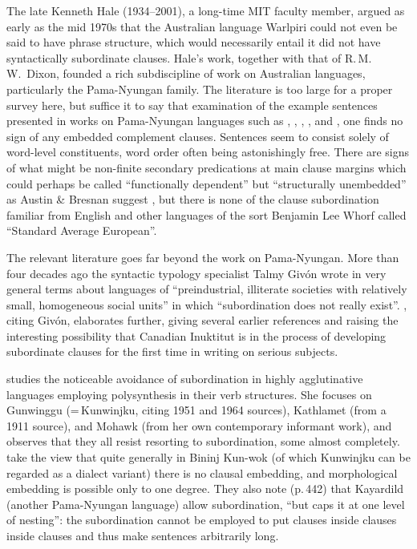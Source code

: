 \documentclass[output=paper,colorlinks,citecolor=brown
]{langscibook}
\begin{document}
The late Kenneth Hale (1934--2001), a long-time MIT faculty member,
argued as early as the mid 1970s that the Australian language Warlpiri
could not even be said to have phrase structure, which would necessarily
entail it did not have syntactically subordinate clauses. Hale's work,
together with that of R.\,M.\,W.\ Dixon, founded a rich subdiscipline
of work on Australian languages, particularly the Pama-Nyungan family.
The literature is too large for a proper survey here, but suffice it to
say that examination of the example sentences presented in works on
Pama-Nyungan languages such as \citet{Hale76}, \citet{Nash80},
\citet{Dixon81}, \citet{AustBres96}, and \citet{Pensalfini04},
one finds no sign of any embedded complement clauses. Sentences
seem to consist solely of word-level constituents, word order often
being astonishingly free. There are signs of what might be non-finite
secondary predications at main clause margins which could perhaps be
called ``functionally dependent'' but ``structurally unembedded'' as
Austin \& Bresnan suggest \citeyearpar[228, esp.\ n.\,13]{AustBres96},
but there is none of the clause subordination familiar from English
and other languages of the sort Benjamin Lee Whorf called
``Standard Average European''.

The relevant literature goes far beyond the work on Pama-Nyungan.
More than four decades ago the syntactic typology
specialist Talmy Giv{\'o}n \citeyearpar[298]{Givon79} wrote in very
general terms about languages of ``preindustrial, illiterate societies
with relatively small, homogeneous social units'' in which
``subordination does not really exist''. \citet[esp.\ pp.\,157--159]{Kalmar85}, citing Giv{\'o}n,
elaborates further, giving several earlier references and raising the
interesting possibility that Canadian Inuktitut is in the process of
developing subordinate clauses for the first time in writing on serious
subjects.

\citet{Mithun84} studies the noticeable avoidance of subordination
in highly agglutinative languages employing polysynthesis in their
verb structures. She focuses on Gunwinggu (=\,Kunwinjku, citing 1951
and 1964 sources), Kathlamet (from a 1911 source), and Mohawk (from
her own contemporary informant work), and observes that they all
resist resorting to subordination, some almost completely. \citet[Section~6]{EvanLevi09} take the view that quite
generally in Bininj Kun-wok (of which Kunwinjku can be regarded as a
dialect variant) there is no clausal embedding, and morphological
embedding is possible only to one degree. They also note (p.\,442)
that Kayardild (another Pama-Nyungan language) allow subordination,
``but caps it at one level of nesting'': the subordination cannot be
employed to put clauses inside clauses inside clauses and thus make
sentences arbitrarily long.
\end{document}
